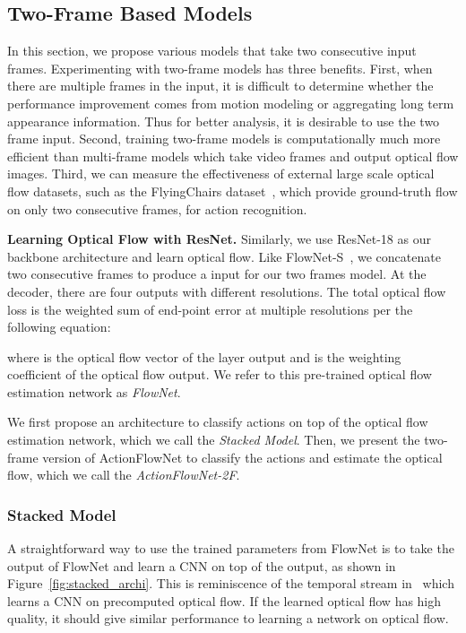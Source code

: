 \documentclass[10pt,twocolumn,letterpaper]{article}
\begin{document}
\subsection{Two-Frame Based Models}
\label{sec:models}
In this section, we propose various models that take two consecutive input frames.
Experimenting with two-frame models has three benefits.
First, when there are multiple frames in the input, it is difficult to determine whether the performance improvement comes from motion modeling or aggregating long term appearance information.
Thus for better analysis, it is desirable to use the two frame input.
Second, training two-frame models is computationally much more efficient than multi-frame models which take  video frames and output  optical flow images.
Third, we can measure the effectiveness of external large scale optical flow datasets, such as the FlyingChairs dataset~\cite{FischerDIHHGSCB15}, which provide ground-truth flow on only two consecutive frames, for action recognition.

\noindent\textbf{Learning Optical Flow with ResNet.}
Similarly, we use ResNet-18 as our backbone architecture and learn optical flow.
Like FlowNet-S~\cite{FischerDIHHGSCB15}, we concatenate two consecutive frames to produce a  input for our two frames model.
At the decoder, there are four outputs with different resolutions.
The total optical flow loss is the weighted sum of end-point error at multiple resolutions per the following equation:
\vspace{-.5em}

where  is the optical flow vector of the  layer output and
 is the weighting coefficient of the  optical flow output.
We refer to this pre-trained optical flow estimation network as \emph{FlowNet}.

We first propose an architecture to classify actions on top of the optical flow estimation network, which we call the \emph{Stacked Model}.
Then, we present the two-frame version of ActionFlowNet to classify the actions and estimate the
optical flow, which we call the \emph{ActionFlowNet-2F}.





\subsubsection{Stacked Model}
A straightforward way to use the trained parameters from FlowNet is to take the output of FlowNet and learn a CNN on top of the output, as shown in Figure~\ref{fig:stacked_archi}.
This is reminiscence of the temporal stream in~\cite{simonyanZ14a} which learns a CNN on precomputed optical flow.
If the learned optical flow has high quality, it should give similar performance to learning a network on optical flow.
\end{document}
